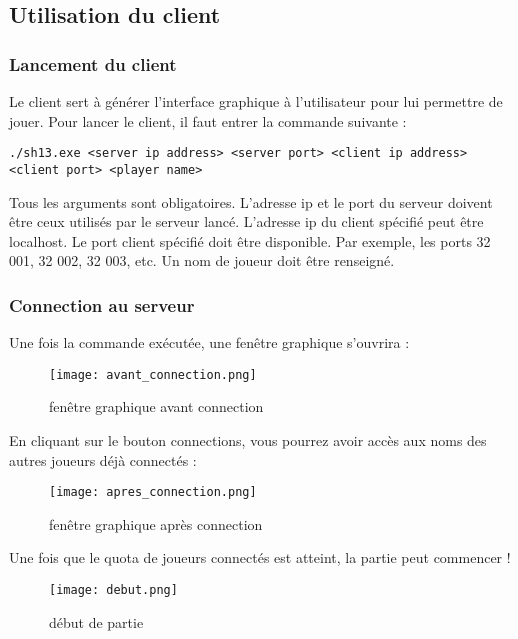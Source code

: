 \subsection{Utilisation du client}

\subsubsection{Lancement du client}

Le client sert à générer l'interface graphique à l'utilisateur pour lui permettre de jouer. Pour lancer le client, il faut entrer la commande suivante :
\begin{verbatim}
./sh13.exe <server ip address> <server port> <client ip address> <client port> <player name>
\end{verbatim}
Tous les arguments sont obligatoires. L'adresse ip et le port du serveur doivent être ceux utilisés par le serveur lancé. L'adresse ip du client spécifié peut être localhost. Le port client spécifié doit être disponible. Par exemple, les ports 32 001, 32 002, 32 003, etc. Un nom de joueur doit être renseigné.

\subsubsection{Connection au serveur}

Une fois la commande exécutée, une fenêtre graphique s'ouvrira :
\begin{figure}[H]
    \begin{center}
        \texttt{[image: avant\_connection.png]}
    \end{center}
     \caption{fenêtre graphique avant connection}
    \label{fig:avant_connection}
\end{figure}
En cliquant sur le bouton connections, vous pourrez avoir accès aux noms des autres joueurs déjà connectés :
\begin{figure}[H]
    \begin{center}
        \texttt{[image: apres\_connection.png]}
    \end{center}
   	 \caption{fenêtre graphique après connection}
    \label{fig:après_connection}
\end{figure}
Une fois que le quota de joueurs connectés est atteint, la partie peut commencer !
\begin{figure}[H]
    \begin{center}
        \texttt{[image: debut.png]}
    \end{center}
     \caption{début de partie}
    \label{fig:debut}
\end{figure}

